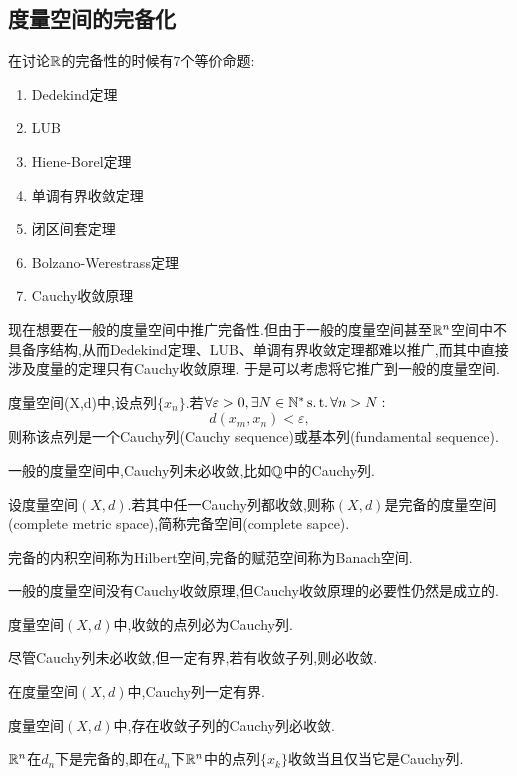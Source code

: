 \subsection{度量空间的完备化}

在讨论$\mathbb{R}$的完备性的时候有$7$个等价命题:
\begin{enumerate}
    \item Dedekind定理
    \item LUB
    \item Hiene-Borel定理
    \item 单调有界收敛定理
    \item 闭区间套定理
    \item Bolzano-Werestrass定理
    \item Cauchy收敛原理
\end{enumerate}
现在想要在一般的度量空间中推广完备性.但由于一般的度量空间甚至$\R^n$空间中不具备序结构,从而Dedekind定理、LUB、单调有界收敛定理都难以推广,而其中直接涉及度量的定理只有Cauchy收敛原理.
于是可以考虑将它推广到一般的度量空间.

\begin{definition}
    [Cauchy列]
    度量空间(X,d)中,设点列$\{x_n\}$.若$\forall\varepsilon >0,\exists N\in\mathbb{N}^*\operatorname{s.t.}\forall n>N:$
    \[d(x_m,x_n)<\varepsilon,\]
    则称该点列是一个Cauchy列(Cauchy sequence)或基本列(fundamental sequence).
\end{definition}

一般的度量空间中,Cauchy列未必收敛,比如$\mathbb{Q}$中的Cauchy列.

\begin{definition}
    [完备的度量空间]
    设度量空间$(X,d)$.若其中任一Cauchy列都收敛,则称$(X,d)$是完备的度量空间(complete metric space),简称完备空间(complete sapce).
\end{definition}

\begin{remark}
    完备的内积空间称为Hilbert空间,完备的赋范空间称为Banach空间.
\end{remark}

一般的度量空间没有Cauchy收敛原理,但Cauchy收敛原理的必要性仍然是成立的.

\begin{proposition}
    度量空间$(X,d)$中,收敛的点列必为Cauchy列.
\end{proposition}

尽管Cauchy列未必收敛,但一定有界,若有收敛子列,则必收敛.

\begin{proposition}
    在度量空间$(X,d)$中,Cauchy列一定有界.
\end{proposition}

\begin{proposition}
    度量空间$(X,d)$中,存在收敛子列的Cauchy列必收敛.
\end{proposition}

\begin{theorem}
    [$\R^n$中的Cauchy收敛原理]
    $\R^n$在$d_n$下是完备的,即在$d_n$下$\R^n$中的点列$\{x_k\}$收敛当且仅当它是Cauchy列.
\end{theorem}